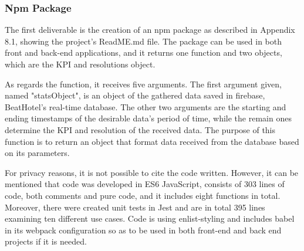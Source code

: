 \subsubsection{Npm Package}
The first deliverable is the creation of an npm package as described in Appendix 8.1, showing the project's ReadME.md file. The package can be used in both front and back-end applications, and it returns one function and two objects, which are the KPI and resolutions object. \par 
As regards the function, it receives five arguments. The first argument given, named "statsObject", is an object of the gathered data saved in firebase, BeatHotel's real-time database. The other two arguments are the starting and ending timestamps of the desirable data's period of time, while the remain ones determine the KPI and resolution of the received data. The purpose of this function is to return an object that format data received from the database based on its parameters. \par
For privacy reasons, it is not possible to cite the code written. However, it can be mentioned that code was developed in ES6 JavaScript, consists of 303 lines of code, both comments and pure code, and it includes eight functions in total. Moreover, there were created unit tests in Jest and are in total 395 lines examining ten different use cases. Code is using enlist-styling and includes babel in its webpack configuration so as to be used in both front-end and back end projects if it is needed. \par

